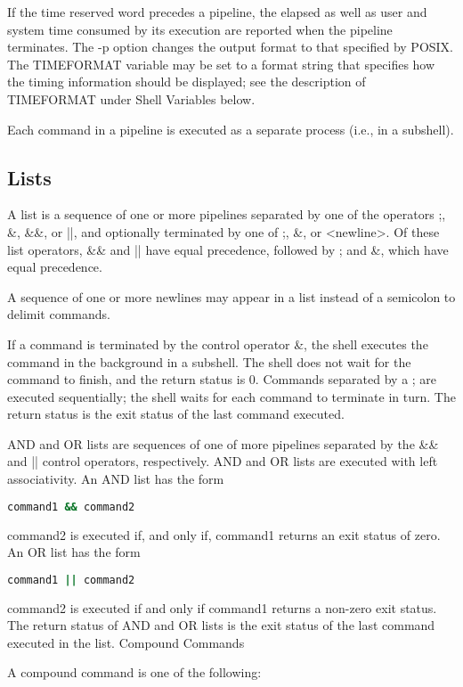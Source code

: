\documentclass[11pt]{article}
\begin{document}
If the time reserved word precedes a pipeline, the elapsed as well as user and system time consumed by its execution are reported when the pipeline terminates. The -p option changes the output format to that specified by POSIX. The TIMEFORMAT variable may be set to a format string that specifies how the timing information should be displayed; see the description of TIMEFORMAT under Shell Variables below.

Each command in a pipeline is executed as a separate process (i.e., in a subshell).

\subsection{Lists}

A list is a sequence of one or more pipelines separated by one of the operators ;, \&, \&\&, or ||, and optionally terminated by one of ;, \&, or <newline>.
Of these list operators, \&\& and || have equal precedence, followed by ; and \&, which have equal precedence.

A sequence of one or more newlines may appear in a list instead of a semicolon to delimit commands.

If a command is terminated by the control operator \&, the shell executes the command in the background in a subshell. The shell does not wait for the command to finish, and the return status is 0. Commands separated by a ; are executed sequentially; the shell waits for each command to terminate in turn. The return status is the exit status of the last command executed.

AND and OR lists are sequences of one of more pipelines separated by the \&\& and || control operators, respectively. AND and OR lists are executed with left associativity. An AND list has the form

\begin{lstlisting}[language=bash]
  command1 && command2
\end{lstlisting}
command2 is executed if, and only if, command1 returns an exit status of zero.
An OR list has the form

\begin{lstlisting}[language=bash]
  command1 || command2
\end{lstlisting}
command2 is executed if and only if command1 returns a non-zero exit status. The return status of AND and OR lists is the exit status of the last command executed in the list.
Compound Commands

A compound command is one of the following:
\end{document}
